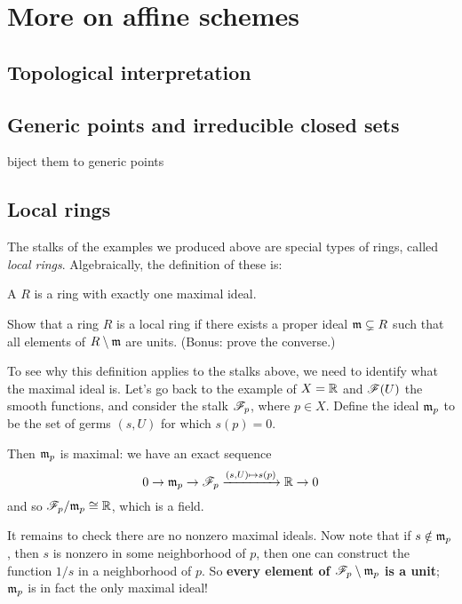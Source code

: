 \chapter{More on affine schemes}
\section{Topological interpretation}

\section{Generic points and irreducible closed sets}
biject them to generic points

\section{Local rings}
The stalks of the examples we produced above are special types
of rings, called \emph{local rings}.
Algebraically, the definition of these is:
\begin{definition}
	A  $R$ is a ring with exactly one maximal ideal.
\end{definition}
\begin{exercise}
	Show that a ring $R$ is a local ring if there exists
	a proper ideal $\mathfrak m \subsetneq R$ such that
	all elements of $R \setminus \mathfrak m$ are units.
	(Bonus: prove the converse.)
\end{exercise}

To see why this definition applies to the stalks above,
we need to identify what the maximal ideal is.
Let's go back to the example of $X = \mathbb R$ and $\mathscr F(U)$ the smooth functions,
and consider the stalk $\mathscr F_{p}$, where $p \in X$.
Define the ideal $\mathfrak m_p$ to be the set of germs $(s,U)$ for which $s(p) = 0$.

Then $\mathfrak m_p$ is maximal: we have an exact sequence
\[ 0 \to \mathfrak m_p \to \mathscr F_p \xrightarrow{(s,U) \mapsto s(p)} \mathbb R \to 0 \]
and so $\mathscr F_p / \mathfrak m_p \cong \mathbb R$, which is a field.

It remains to check there are no nonzero maximal ideals.
Now note that if $s \notin \mathfrak m_p$,
then $s$ is nonzero in some neighborhood of $p$,
then one can construct the function $1/s$ in a neighborhood of $p$.
So \textbf{every element of $\mathscr F_p \setminus \mathfrak m_p$ is a unit};
$\mathfrak m_p$ is in fact the only maximal ideal!

